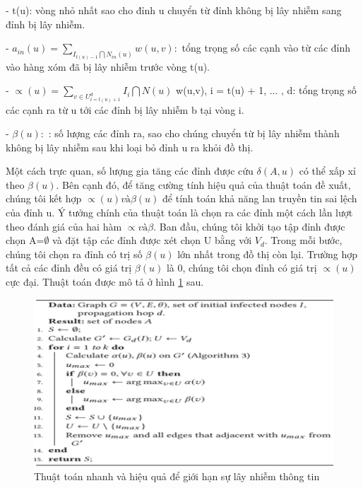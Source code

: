  		- t(u): vòng nhỏ nhất sao cho đỉnh u chuyển từ đỉnh không bị lây nhiễm sang đỉnh bị lây nhiễm.
 		
 		- $a_{in}(u) = \sum_{I_{t(u) - 1} \bigcap N_{in}(u)} w(u,v):$ tổng trọng số các cạnh vào từ các đỉnh vào hàng xóm đã bị lây nhiễm trước vòng t(u).
 		
 		- $\propto(u) = \sum_{v \in U^{d}_{i=t(u)+1}} I_{i} \bigcap N(u)$ w(u,v), i = t(u) + 1, ... , d: tổng trọng số các cạnh ra từ u tới các đỉnh bị lây nhiễm b tại vòng i.
 		
		- $\beta(u): $ : số lượng các đỉnh ra, sao cho chúng chuyển từ bị lây nhiễm thành không bị lây nhiễm sau khi loại bỏ đỉnh u ra khỏi đồ thị.
		
		Một cách trực quan, số lượng gia tăng các đỉnh được cứu $\delta(A, u)$ có thể xấp xỉ theo $\beta(u)$. Bên cạnh đó, để tăng cường tính hiệu quả của thuật toán đề xuất, chúng tôi kết hợp $\propto(u) và \beta(u)$ để tính toán khả năng lan truyền tin sai lệch của đỉnh u. Ý tưởng chính của thuật toán là chọn ra các đỉnh một cách lần lượt theo đánh giá của hai hàm $\propto và \beta$. Ban đầu, chúng tôi khởi tạo tập đỉnh được chọn A=$\emptyset$ và đặt tập các đỉnh được xét chọn U bằng với $V_{d}$. Trong mỗi bước, chúng tôi chọn ra đỉnh có trị số $\beta(u)$ lớn nhất trong đồ thị còn lại. Trường hợp tất cả các đỉnh đều có giá trị $\beta(u)$ là 0, chúng tôi chọn đỉnh có giá trị $\propto(u)$ cực đại. Thuật toán được mô tả ở hình \ref{refthuattoan1} sau.
		\begin{center}
			\begin{figure}[htp]
				\begin{center}
					\includegraphics [scale=.65]{picture/thuattoan1}
				\end{center}
				\caption{Thuật toán nhanh và hiệu quả để giới hạn sự lây nhiễm thông tin}
				\label{refthuattoan1}
			\end{figure}
		\end{center}
	
